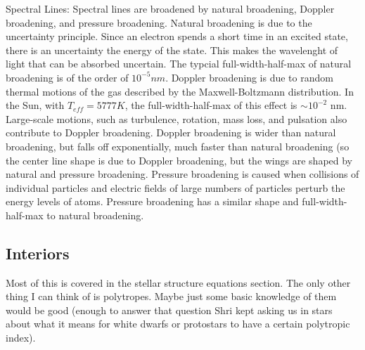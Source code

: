 Spectral Lines:
Spectral lines are broadened by natural broadening, Doppler broadening, and pressure broadening.  
Natural broadening is due to the uncertainty principle.  Since an electron spends a short time 
in an excited state, there is an uncertainty the energy of the state.  This makes the wavelenght 
of light that can be absorbed uncertain.  The typcial full-width-half-max of natural broadening is 
of the order of $10^{-5}nm$.  Doppler broadening is due to random thermal motions of the gas 
described by the Maxwell-Boltzmann distribution.  In the Sun, with $T_{eff}=5777 K$, the 
full-width-half-max of this effect is $\sim 10^{-2}$ nm.  Large-scale motions, such as turbulence, 
rotation, mass loss, and pulsation also contribute to Doppler broadening.  Doppler broadening 
is wider than natural broadening, but falls off exponentially, much faster than natural 
broadening (so the center line shape is due to Doppler broadening, but the wings are shaped by 
natural and pressure broadening.  Pressure broadening is caused when collisions of individual 
particles and electric fields of large numbers of particles perturb the energy levels of atoms.  
Pressure broadening has a similar shape and full-width-half-max to natural broadening.

\subsection{Interiors}
Most of this is covered in the stellar structure equations section.  The only other thing I can
think of is polytropes.  Maybe just some basic knowledge of them would be good (enough to 
answer that question Shri kept asking us in stars about what it means for white dwarfs or 
protostars to have a certain polytropic index).


